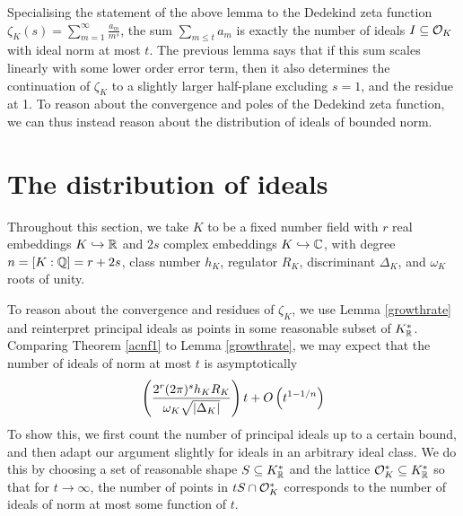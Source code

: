 \documentclass[11pt]{report}
\begin{document}
Specialising the statement of the above lemma to the Dedekind zeta function $\zeta_K(s) = \sum_{m = 1}^\infty \frac{a_m}{m^s}$, the sum $\sum_{m \leq t} a_m$ is exactly the number of ideals $I \subseteq \mathcal{O}_K$ with ideal norm at most $t$. The previous lemma says that if this sum scales linearly with some lower order error term, then it also determines the continuation of $\zeta_K$ to a slightly larger half-plane excluding $s = 1$, and the residue at 1. To reason about the convergence and poles of the Dedekind zeta function, we can thus instead reason about the distribution of ideals of bounded norm.
\section{The distribution of ideals}
Throughout this section, we take $K$ to be a fixed number field with $r$ real embeddings $K \hookrightarrow \mathbb{R}$ and $2s$ complex embeddings $K \hookrightarrow \mathbb{C}$, with degree $n = [K : \mathbb{Q}] = r + 2s$, class number $h_K$, regulator $R_K$, discriminant $\Delta_K$, and $\omega_K$ roots of unity.

To reason about the convergence and residues of $\zeta_K$, we use Lemma \ref{growthrate} and reinterpret principal ideals as points in some reasonable subset of $K_{\mathbb{R}}^*$. Comparing Theorem \ref{acnf1} to Lemma \ref{growthrate}, we may expect that the number of ideals of norm at most $t$ is asymptotically
$$
    \left(  \frac{2^r(2\pi)^sh_KR_K}{\omega_K\sqrt{\left| \Delta_K \right|}}  \right)t + O\left(  t^{1 - 1/n}  \right)
$$
To show this, we first count the number of principal ideals up to a certain bound, and then adapt our argument slightly for ideals in an arbitrary ideal class. We do this by choosing a set of reasonable shape $S \subseteq K_{\mathbb{R}}^*$ and the lattice $\mathcal{O}_K^* \subseteq K_{\mathbb{R}}^*$ so that for $t \to \infty$, the number of points in $tS \cap \mathcal{O}_K^*$ corresponds to the number of ideals of norm at most some function of $t$.
\end{document}
